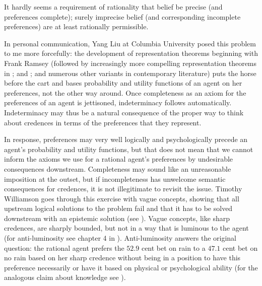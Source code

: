 \documentclass[11pt]{article}
\begin{document}
\begin{quotex}
  It hardly seems a requirement of rationality that belief be precise
  (and preferences complete); surely imprecise belief (and
  corresponding incomplete preferences) are at least rationally
  permissible. 
\end{quotex}

In personal communication, Yang Liu at Columbia University posed this
problem to me more forcefully: the development of representation
theorems beginning with Frank Ramsey (followed by increasingly more
compelling representation theorems in ; and
; and numerous other variants in contemporary
literature) puts the horse before the cart and bases probability and
utility functions of an agent on her preferences, not the other way
around. Once completeness as an axiom for the preferences of an agent
is jettisoned, indeterminacy follows automatically. Indeterminacy may
thus be a natural consequence of the proper way to think about
credences in terms of the preferences that they represent.

In response, preferences may very well logically and psychologically
precede an agent's probability and utility functions, but that does
not mean that we cannot inform the axioms we use for a rational
agent's preferences by undesirable consequences downstream.
Completeness may sound like an unreasonable imposition at the outset,
but if incompleteness has unwelcome semantic consequences for
credences, it is not illegitimate to revisit the issue. Timothy
Williamson goes through this exercise with vague concepts, showing
that all upstream logical solutions to the problem fail and that it
has to be solved downstream with an epistemic solution (see
). Vague concepts, like sharp credences, are
sharply bounded, but not in a way that is luminous to the agent (for
anti-luminosity see chapter 4 in ).
Anti-luminosity answers the original question: the rational agent
prefers the $52.9$ cent bet on rain to a $47.1$ cent bet on no rain
based on her sharp credence without being in a position to have this
preference necessarily or have it based on physical or psychological
ability (for the analogous claim about knowledge see
).
\end{document}
